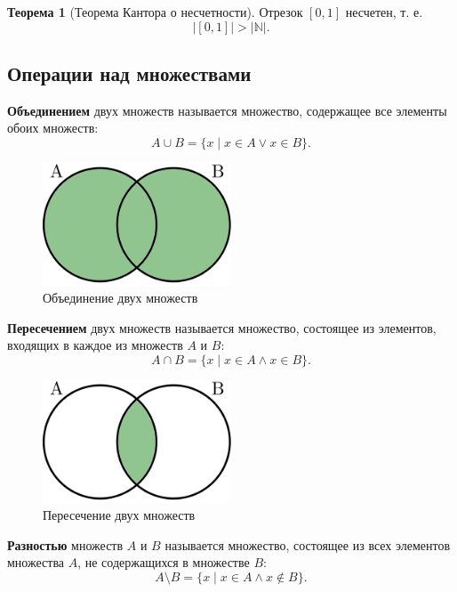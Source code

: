 \documentclass[a5paper, 11pt]{extarticle}
\theoremstyle{definition}
\newtheorem*{theorem*}{Теорема}
\theoremstyle{definition}
\theoremstyle{definition}
\numberwithin{figure}{section}
\numberwithin{table}{section}
\begin{document}
\begin{theorem*}[Теорема Кантора о несчетности]
    Отрезок \([0, 1]\) несчетен, т. е.
    \[
        |[0, 1]| > |\mathbb{N}|.
    \]
\end{theorem*}

\subsection{Операции над множествами}

\textbf{Объединением} двух множеств называется множество, содержащее все элементы обоих множеств:
\[
    A \cup B = \{x \mid x \in A \lor x \in B\}.
\]

\begin{figure}[H]
    \centering
    \includegraphics[width=0.5\textwidth]{images/set-combining.png}
    \caption{Объединение двух множеств}
\end{figure}

\textbf{Пересечением} двух множеств называется множество, состоящее из элементов, входящих в каждое из множеств \(A\) и \(B\):
\[
    A \cap B = \{x \mid x \in A \land x \in B\}.
\]

\begin{figure}[H]
    \centering
    \includegraphics[width=0.5\textwidth]{images/set-intersection.png}
    \caption{Пересечение двух множеств}
\end{figure}

\textbf{Разностью} множеств \(A\) и \(B\) называется множество, состоящее из всех элементов множества \(A\), не содержащихся в множестве \(B\):
\[
    A \setminus B = \{x \mid x \in A \land x \notin B\}.
\]
\end{document}
